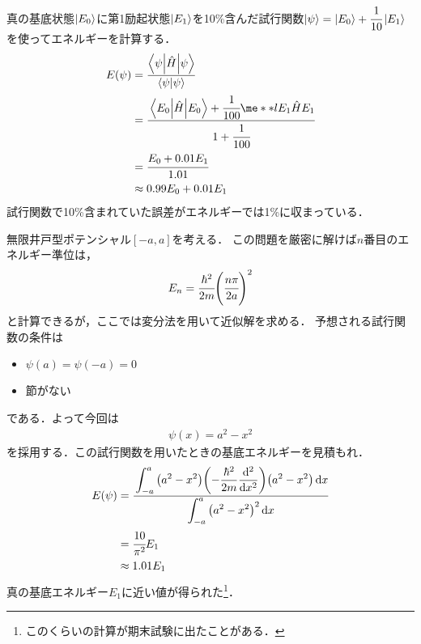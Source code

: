 \documentclass{report}
\begin{document}
  真の基底状態$\ket{E_0}$に第1励起状態$\ket{E_1}$を10\%含んだ試行関数$\ket{\psi} = \ket{E_0} + \cfrac{1}{10}\ket{E_1}$を使ってエネルギーを計算する．
  \begin{align}
    E(\psi) &= \frac{\mel**{\psi}{\hat{H}}{\psi}}{\braket{\psi}} \\
    &= \cfrac{\mel**{E_0}{\hat{H}}{E_0} + \cfrac{1}{100}\me**l{E_1}{\hat{H}}{E_1}}{1 + \cfrac{1}{100}} \\
    &= \cfrac{E_0 + 0.01E_1}{1.01}\\
    &\approx 0.99E_0 + 0.01E_1
  \end{align}
  試行関数で10\%含まれていた誤差がエネルギーでは1\%に収まっている．
  \begin{myex}{}{}
    無限井戸型ポテンシャル$[-a, a]$を考える．
    この問題を厳密に解けば$n$番目のエネルギー準位は，
    \begin{align}
      E_n = \cfrac{\hbar^2}{2m}\qty(\cfrac{n\pi}{2a})^2
    \end{align}
    と計算できるが，ここでは変分法を用いて近似解を求める．
    予想される試行関数の条件は
    \begin{itemize}
      \item $\psi(a) = \psi(-a) = 0$
      \item 節がない
    \end{itemize}
    である．よって今回は
    \begin{align}
      \psi(x) = a^2 - x^2
    \end{align}
    を採用する．この試行関数を用いたときの基底エネルギーを見積もれ．
    \tcblower
    \begin{align}
      E(\psi) &= \cfrac{\displaystyle \int_{-a}^{a}\qty(a^2 - x^2)\qty(-\frac{\hbar^2}{2m}\dv[2]{x})\qty(a^2 - x^2)\dd{x}}{\displaystyle \int_{-a}^{a}\qty(a^2 - x^2)^2\dd{x}} \\
      &= \cfrac{10}{\pi^2}E_1 \\
      &\approx 1.01E_1
    \end{align}
    真の基底エネルギー$E_1$に近い値が得られた\footnote{このくらいの計算が期末試験に出たことがある．}．
  \end{myex}
\end{document}
